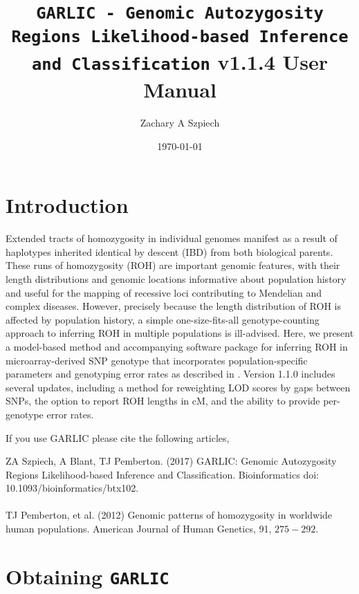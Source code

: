 \documentclass[12pt]{article}%
\title{{\tt GARLIC - Genomic Autozygosity Regions Likelihood-based Inference and Classification} v1.1.4 User Manual}
\date{\today}
\author{Zachary A Szpiech}
\begin{document}
\lstset{breaklines=true,basicstyle=\ttfamily}

\null  %
\nointerlineskip  %
\vfill
\let\snewpage \newpage
\let\newpage \relax
\maketitle
\thispagestyle{empty}
\let \newpage \snewpage
\vfill 
\break %

\tableofcontents 

\newpage

\section{Introduction}

Extended tracts of homozygosity in individual genomes manifest as a result of haplotypes inherited identical by descent (IBD) from both biological parents. These runs of homozygosity (ROH) are important genomic features, with their length distributions and genomic locations informative about population history and useful for the mapping of recessive loci contributing to Mendelian and complex diseases. However, precisely because the length distribution of ROH is affected by population history, a simple one-size-fits-all genotype-counting approach to inferring ROH in multiple populations is ill-advised. Here, we present a model-based method and accompanying software package for inferring ROH in microarray-derived SNP genotype that incorporates population-specific parameters and genotyping error rates as described in \cite{PembertonEtAl12:AJHG}. Version 1.1.0 includes several updates, including a method for reweighting LOD scores by gaps between SNPs, the option to report ROH lengths in cM, and the ability to provide per-genotype error rates.

If you use GARLIC please cite the following articles,

\noindent ZA Szpiech, A Blant, TJ Pemberton. (2017) GARLIC: Genomic Autozygosity Regions Likelihood-based Inference and Classification. Bioinformatics doi: 10.1093/bioinformatics/btx102.
\\\\
TJ Pemberton, et al. (2012) Genomic patterns of homozygosity in worldwide human populations. American Journal of Human Genetics, 91, $275-292$.

\section{Obtaining {\tt GARLIC}}
\end{document}
